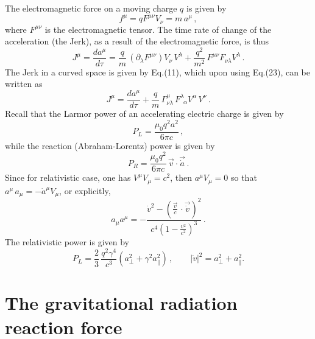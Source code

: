 \documentclass[12pt]{article}
\begin{document}
The electromagnetic force on a moving charge $q$ is given by
\begin{equation}
f^\mu=qF^{\mu\nu}V_\nu=m\,a^\mu\,,
\end{equation}
where $F^{\mu\nu}$ is the electromagnetic tensor.
The time rate of change of the acceleration (the Jerk), as a result of the electromagnetic force, is thus
\begin{equation}
J^\mu=\frac{da^\mu}{d\tau}=\frac{q}{m}\,(\partial_\lambda F^{\mu\nu})V_\nu\,V^\lambda+\frac{q^2}{m^2}\,F^{\mu\nu}F_{\nu\lambda}V^\lambda\,.
\end{equation}
The Jerk in a curved space is given by  Eq.(11), which upon using Eq.(23), can be written as
\begin{equation}
J^\mu=\frac{da^\mu}{d\tau}+\frac{q}{m}\, \Gamma^\mu_{\nu\lambda}\,F^{\lambda}_{\,\,\,\alpha}V^\alpha\,V^\nu\,.
\end{equation}
Recall that the Larmor power of an accelerating electric charge  is given by {\cite{larmor}}
\begin{equation}
P_L=\frac{\mu_0q^2a^2}{6\pi c}\,,
\end{equation}
while the reaction (Abraham-Lorentz) power is given by
\begin{equation}
P_R=\frac{\mu_0q^2}{6\pi c}\,\vec{v}\cdot\vec{\dot a}\,.
\end{equation}
Since for relativistic case, one has $V^\mu V_\mu=c^2$, then $a^\mu V_\mu=0$ so that $a^\mu\, a_\mu=-\dot a^\mu V_\mu$, or explicitly,
\begin{equation}
 a_\mu a^\mu=-\frac{\dot v^2-(\frac{\vec{v}}{c}\,\cdot\vec{\dot v})^2}{c^4(1-\frac{v^2}{c^2})^3}\,.
\end{equation}
The relativistic power is given by
$$P_L=\frac{2}{3}\,\frac{q^2\gamma^4}{c^3}(a^2_\bot+\gamma^2a^2_\parallel)\,,\qquad |\dot v|^2=a^2_\bot+a^2_\parallel.$$

\section{{The gravitational radiation reaction force}}
\end{document}
